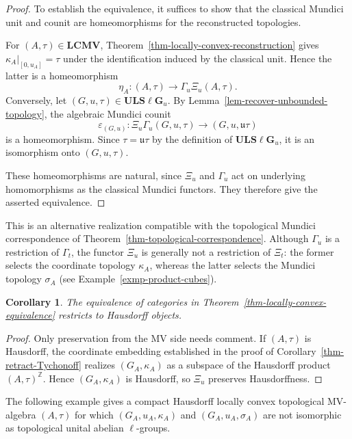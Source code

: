 \documentclass[preprint,3p]{elsarticle}
\theoremstyle{plain}
\newtheorem{cor}[thm]{Corollary}
\theoremstyle{definition}
\newcommand{\LCMV}{\mathbf{LCMV}}
\newcommand{\ULS}{\mathbf{ULS\ell G}_{u}}
\numberwithin{equation}{section}
\begin{document}
\begin{proof}
To establish the equivalence, it suffices to show that
the classical Mundici unit and counit are homeomorphisms
for the reconstructed topologies.

For $(A,\tau)\in\LCMV$,
Theorem~\ref{thm-locally-convex-reconstruction}
gives $\kappa_A|_{[0,u_A]}=\tau$ under the
identification induced by the classical unit.
Hence the latter is a homeomorphism
\[
 \eta_A\colon(A,\tau)\longrightarrow
 \Gamma_u\Xi_u(A,\tau).
\]
Conversely, let $(G,u,\tau)\in\ULS$.
By Lemma~\ref{lem-recover-unbounded-topology},
the algebraic Mundici counit
\[
 \varepsilon_{(G,u)}\colon
 \Xi_u\Gamma_u(G,u,\tau)\longrightarrow
 (G,u,\mathfrak u\tau)
\]
is a homeomorphism.
Since $\tau=\mathfrak u\tau$ by the definition
of $\ULS$, it is an isomorphism onto $(G,u,\tau)$.

These homeomorphisms are natural, since
$\Xi_u$ and $\Gamma_u$ act on underlying
homomorphisms as the classical Mundici functors.
They therefore give the asserted equivalence.
\end{proof}

This is an alternative realization compatible with the topological
Mundici correspondence of Theorem~\ref{thm-topological-correspondence}.
Although $\Gamma_u$ is a restriction of $\Gamma_t$, the functor
$\Xi_u$ is generally not a restriction of $\Xi_t$:
the former selects the coordinate topology $\kappa_A$,
whereas the latter selects the Mundici topology $\sigma_A$
(see Example~\ref{exmp-product-cubes}).

\begin{cor}
\label{cor-Hausdorff-locally-convex-equivalence}
The equivalence of categories in
Theorem~\ref{thm-locally-convex-equivalence} restricts
to Hausdorff objects.
\end{cor}

\begin{proof}
Only preservation from the MV side needs comment.
If $(A,\tau)$ is Hausdorff, the coordinate embedding established
in the proof of Corollary~\ref{thm-retract-Tychonoff} realizes
$(G_A,\kappa_A)$ as a subspace of the Hausdorff product
$(A,\tau)^{\mathbb Z}$.  Hence $(G_A,\kappa_A)$ is Hausdorff,
so $\Xi_u$ preserves Hausdorffness.
\end{proof}

The following example gives a compact Hausdorff locally convex
topological MV-algebra $(A,\tau)$ for which
$(G_A,u_A,\kappa_A)$ and $(G_A,u_A,\sigma_A)$ are not isomorphic
as topological unital abelian $\ell$-groups.
\end{document}
